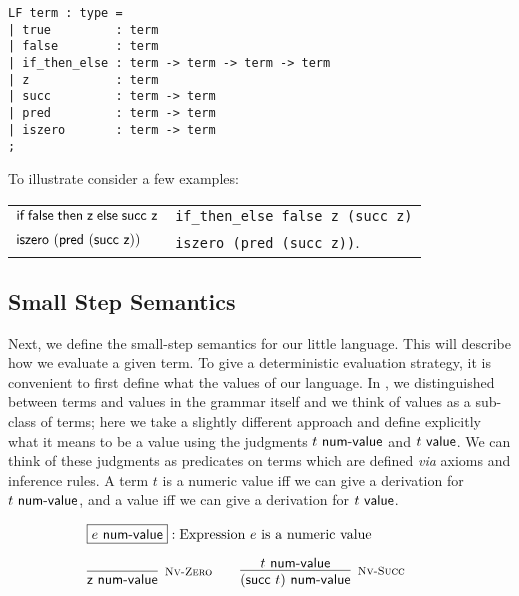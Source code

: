 \begin{lstlisting}
LF term : type =
| true         : term
| false        : term
| if_then_else : term -> term -> term -> term
| z            : term
| succ         : term -> term
| pred         : term -> term
| iszero       : term -> term
;
\end{lstlisting}

To illustrate consider a few examples:

\begin{center}
\begin{tabular}{l@{\quad is represented as \quad}l}
$\textsf{if\;} \textsf{false} \textsf{\;then\;} \textsf{z} \textsf{\;else\;} \textsf{succ}~\textsf{z}$ &
\lstinline!if_then_else false z (succ z)!\\
$\textsf{iszero}~(\textsf{pred}~(\textsf{succ}~\textsf{z}))$ & \lstinline!iszero (pred (succ z))!.
\end{tabular}  
\end{center}


\subsection{Small Step Semantics}

Next,  we define  the small-step semantics  for our  little language.  This will
describe  how  we evaluate  a  given term.  To give  a  deterministic evaluation
strategy,  it is convenient to first define what the values of our language.  In
\cite{TAPL}, we distinguished between terms and values in the grammar itself and
we think of values  as a sub-class of terms;  here we take  a slightly different
approach and define explicitly  what it means  to be a value using the judgments
$t ~\textsf{num-value}$ and $t ~\mathsf{value}$.  We can think of these judgments  as predicates on
terms which are defined  {\em via}  axioms and inference rules.  A term $t$ is a
numeric value iff we can give a derivation for $t ~\textsf{num-value}$, and a value iff we
can give a derivation for $t ~\mathsf{value}$.

\[
\begin{array}{c}
\multicolumn{1}{l}{\fbox{$e \NumValue$}: \mbox{Expression $e$ is a numeric value}}\\[1em]
\infer[\NVZero]{\tmzero \NumValue}{} \qquad
\infer[\NVSucc]{(\tmsucc t) \NumValue}{t \NumValue} \qquad
\end{array}
\]

